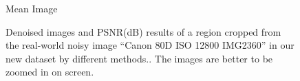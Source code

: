 \begin{figure}[t!]
{\begin{minipage}[t]{0.19\textwidth}
{\footnotesize Mean Image}
\end{minipage}
}  \vspace{-3mm}
    \caption{Denoised images and PSNR(dB) results of a region cropped from the real-world noisy image ``Canon 80D ISO 12800 IMG2360'' in our new dataset by different methods.. The images are better to be zoomed in on screen.}
    \label{fig3-19}
\end{figure}

\begin{figure}[t!]
    \centering
{}
\end{figure}
